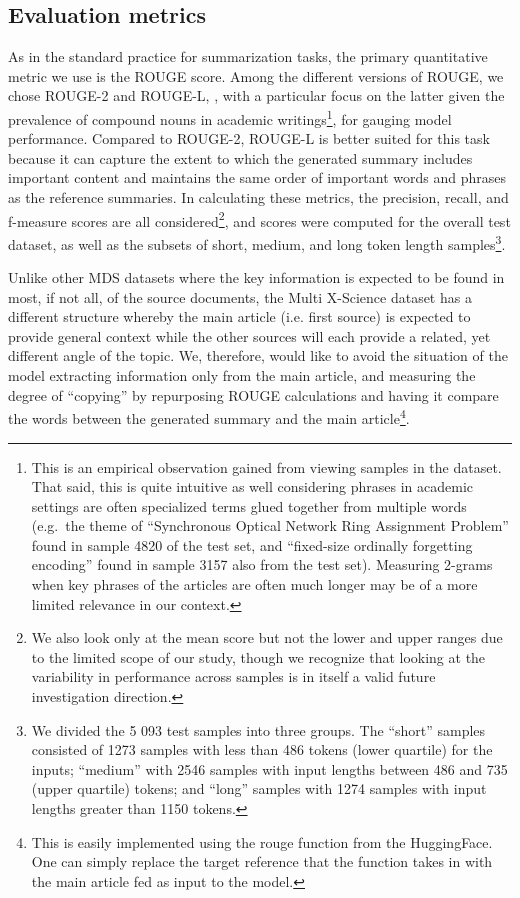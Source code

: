 \documentclass[12pt, twocolumn]{article}
\numberwithin{equation}{section}
\begin{document}
\subsection{Evaluation metrics}
\label{ssec:eval-metrics}

As in the standard practice for summarization tasks, the primary quantitative metric we use is the ROUGE score.  Among the different versions of ROUGE, we chose ROUGE-2 and ROUGE-L, , with a particular focus on the latter given the prevalence of compound nouns in academic writings\footnote{This is an empirical observation gained from viewing samples in the dataset.  That said, this is quite intuitive as well considering phrases in academic settings are often specialized terms glued together from multiple words (e.g.~the theme of ``Synchronous Optical Network Ring Assignment Problem'' found in sample 4820 of the test set, and ``fixed-size ordinally forgetting encoding'' found in sample 3157 also from the test set).  Measuring 2-grams when key phrases of the articles are often much longer may be of a more limited relevance in our context.}, for gauging model performance.  Compared to ROUGE-2, ROUGE-L is better suited for this task because it can capture the extent to which the generated summary includes important content and maintains the same order of important words and phrases as the reference summaries.  In calculating these metrics, the precision, recall, and f-measure scores are all considered\footnote{We also look only at the mean score but not the lower and upper ranges due to the limited scope of our study, though we recognize that looking at the variability in performance across samples is in itself a valid future investigation direction.}, and scores were computed for the overall test dataset, as well as the subsets of short, medium, and long token length samples\footnote{We divided the 5 093 test samples into three groups.  The ``short'' samples consisted of 1273 samples with less than 486 tokens (lower quartile) for the inputs; ``medium'' with 2546 samples with input lengths between 486 and 735 (upper quartile) tokens; and ``long'' samples with 1274 samples with input lengths greater than 1150 tokens.}.  

Unlike other MDS datasets where the key information is expected to be found in most, if not all, of the source documents, the Multi X-Science dataset has a different structure whereby the main article (i.e. first source) is expected to provide general context while the other sources will each provide a related, yet different angle of the topic.  We, therefore, would like to avoid the situation of the model extracting information only from the main article, and measuring the degree of ``copying'' by repurposing ROUGE calculations and having it compare the words between the generated summary and the main article\footnote{This is easily implemented using the rouge function from the HuggingFace.  One can simply replace the target reference that the function takes in with the main article fed as input to the model.}.
\end{document}
